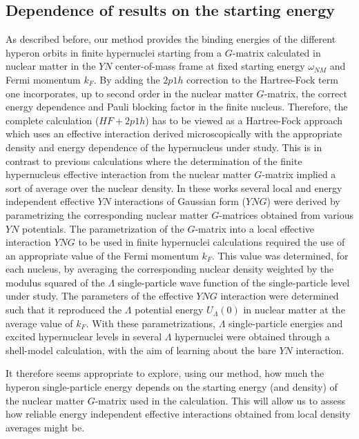 \subsection{Dependence of results on the starting energy}
\label{results1}

As described before, our method provides the binding energies of the
different hyperon orbits in finite hypernuclei starting from a
$G$-matrix calculated in nuclear matter in the $YN$
center-of-mass frame at
fixed starting energy $\omega_{NM}$ and Fermi momentum $k_F$.
By adding the $2p1h$ correction to the Hartree-Fock term one incorporates,
up to second order in the nuclear matter $G$-matrix, the correct
energy dependence and Pauli blocking factor in the finite nucleus.
Therefore, the complete calculation ($HF+2p1h$) has to be
viewed as a Hartree-Fock approach which uses an 
effective interaction derived microscopically with the appropriate density and energy
dependence of the hypernucleus under study.
This is in contrast to previous calculations 
\cite{yama85,yama90,yama92,yama94} where the determination of 
the finite hypernucleus effective interaction from
the nuclear matter $G$-matrix implied a sort of
average over the nuclear density. In these works several local and
energy independent effective $YN$ interactions of Gaussian form ($YNG$)
were derived by parametrizing the corresponding nuclear matter
$G$-matrices obtained from various $YN$ potentials.
The parametrization of the $G$-matrix into a local effective
interaction $YNG$ to be used in finite hypernuclei calculations
required the use of an appropriate value of the Fermi momentum $k_F$.
This value was determined, for each
nucleus, by averaging the corresponding nuclear density weighted by
the modulus squared of the $\Lambda$
single-particle wave function of the single-particle
level under study. The parameters of the effective $YNG$ interaction 
were determined such that it
reproduced the
$\Lambda$ potential energy $U_\Lambda(0)$ in nuclear matter at the
average value of $k_F$.
With these parametrizations, $\Lambda$
single-particle energies and excited hypernuclear levels in several
$\Lambda$
hypernuclei were obtained through a shell-model calculation, with the
aim of learning about the bare $YN$ interaction.

It therefore seems appropriate to explore, using our method, how much
the hyperon single-particle energy depends on the starting energy (and
density) 
of the nuclear matter
$G$-matrix used in the calculation. This will allow us to assess
how reliable energy independent effective interactions obtained
from local density averages might be.



